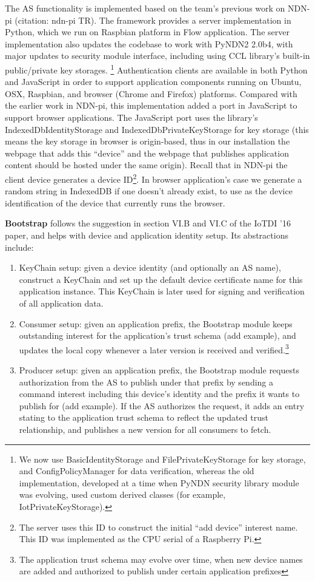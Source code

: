 The AS functionality is implemented based on the team's previous work on NDN-pi (citation: ndn-pi TR).
The framework provides a server implementation in Python, which we run on Raspbian platform in Flow application.
The server implementation also updates the codebase to work with PyNDN2 2.0b4, with major updates to security module interface, including using CCL library's built-in public/private key storages. \footnote{We now use BasicIdentityStorage and FilePrivateKeyStorage for key storage, and ConfigPolicyManager for data verification, whereas the old implementation, developed at a time when PyNDN security library module was evolving, used custom derived classes (for example, IotPrivateKeyStorage).}
Authentication clients are available in both Python and JavaScript in order to support application components running on Ubuntu, OSX, Raspbian, and browser (Chrome and Firefox) platforms.
Compared with the earlier work in NDN-pi, this implementation added a port in JavaScript to support browser applications. 
The JavaScript port uses the library's IndexedDbIdentityStorage and IndexedDbPrivateKeyStorage for key storage (this means the key storage in browser is origin-based, thus in our installation the webpage that adds this ``device'' and the webpage that publishes application content should be hosted under the same origin). 
Recall that in NDN-pi the client device generates a device ID\footnote{The server uses this ID to construct the initial ``add device'' interest name. This ID was implemented as the CPU serial of a Raspberry Pi.}. 
In browser application's case we generate a random string in IndexedDB if one doesn't already exist, to use as the device identification of the device that currently runs the browser.


\textbf{Bootstrap} follows the suggestion in section VI.B and VI.C of the IoTDI '16 paper, and helps with device and application identity setup. Its abstractions include: 
\begin{enumerate}
\item KeyChain setup: given a device identity (and optionally an AS name), construct a KeyChain and set up the default device certificate name for this application instance. This KeyChain is later used for signing and verification of all application data.
\item Consumer setup: given an application prefix, the Bootstrap module keeps outstanding interest for the application's trust schema (add example), and updates the local copy whenever a later version is received and verified.\footnote{The application trust schema may evolve over time, when new device names are added and authorized to publish under certain application prefixes}
\item Producer setup: given an application prefix, the Bootstrap module requests authorization from the AS to publish under that prefix by sending a command interest including this device's identity and the prefix it wants to publish for (add example). If the AS authorizes the request, it adds an entry stating to the application trust schema to reflect the updated trust relationship, and publishes a new version for all consumers to fetch.
\end{enumerate}

